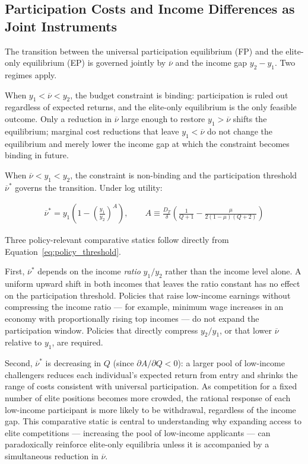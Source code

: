 \documentclass[
    oneside,
    fontsize=10pt,leqno]{article}
\begin{document}
\subsection{Participation Costs and Income Differences as Joint Instruments}

The transition between the universal participation equilibrium
(FP) and the elite-only equilibrium (EP) is governed jointly
by $\overline{\nu}$ and the income gap $y_2 - y_1$. Two regimes apply.

When $y_1 < \overline{\nu} < y_2$, the budget constraint is binding:
participation is ruled out regardless of expected returns, and the
elite-only equilibrium is the only feasible outcome. Only a reduction
in $\overline{\nu}$ large enough to restore $y_1 > \overline{\nu}$
shifts the equilibrium; marginal cost reductions that leave
$y_1 < \overline{\nu}$ do not change the equilibrium and merely lower
the income gap at which the constraint becomes binding in future.

When $\overline{\nu} < y_1 < y_2$, the constraint is non-binding and
the participation threshold $\overline{\nu}^*$ governs the transition.
Under log utility:

\begin{align}
\overline{\nu}^{*} = y_{1}\!\left(1 - \left(\frac{y_1}{y_2}\right)^{\!A}\right),
\qquad
A \equiv \frac{D_T}{\delta}\!\left(\frac{1}{Q+1} - \frac{\mu}{2(1-\mu)(Q+2)}\right)
\label{eq:policy_threshold}
\end{align}

\noindent Three policy-relevant comparative statics follow directly
from Equation~\eqref{eq:policy_threshold}.

First, $\overline{\nu}^*$ depends on the income \emph{ratio}
$y_1/y_2$ rather than the income level alone. A uniform upward shift
in both incomes that leaves the ratio constant has no effect on the
participation threshold. Policies that raise low-income earnings
without compressing the income ratio --- for example, minimum wage
increases in an economy with proportionally rising top incomes ---
do not expand the participation window. Policies that directly
compress $y_2/y_1$, or that lower $\overline{\nu}$ relative to
$y_1$, are required.

Second, $\overline{\nu}^*$ is decreasing in $Q$ (since
$\partial A/\partial Q < 0$): a larger pool of low-income challengers
reduces each individual's expected return from entry and shrinks the
range of costs consistent with universal participation. As
competition for a fixed number of elite positions becomes more
crowded, the rational response of each low-income participant is
more likely to be withdrawal, regardless of the income gap. This
comparative static is central to understanding why expanding access
to elite competitions --- increasing the pool of low-income
applicants --- can paradoxically reinforce elite-only equilibria
unless it is accompanied by a simultaneous reduction in
$\overline{\nu}$.
\end{document}
